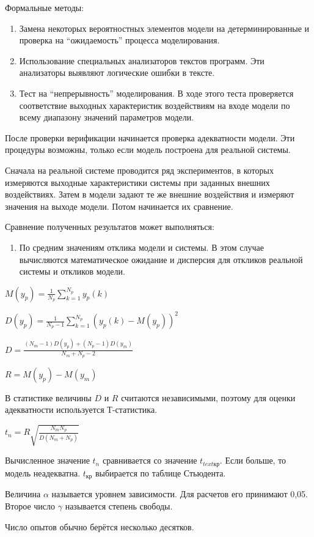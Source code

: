 \documentclass[12pt, russian, oneside, article]{ncc}
\begin{document}
Формальные методы:
\begin{enumerate}
\item Замена некоторых вероятностных элементов модели на детерминированные и проверка на ``ожидаемость'' процесса моделирования.
\item Использование специальных анализаторов текстов программ. Эти анализаторы выявляют логические ошибки в тексте.
\item Тест на ``непрерывность'' моделирования. В ходе этого теста проверяется соответствие выходных характеристик воздействиям на входе модели по всему диапазону значений параметров модели.
\end{enumerate}

После проверки верификации начинается проверка адекватности модели. Эти процедуры возможны, только если модель построена для реальной системы.

Сначала на реальной системе проводится ряд экспериментов, в которых измеряются выходные характеристики системы при заданных внешних воздействиях. Затем в модели задают те же внешние воздействия и измеряют значения на выходе модели. Потом начинается их сравнение.

Сравнение полученных результатов может выполняться:
\begin{enumerate}
\item По средним значениям отклика модели и системы. В этом случае вычисляются математическое ожидание и дисперсия для откликов реальной системы и откликов модели.
\end{enumerate}

$M(y_p) = \frac{1}{N_p}\sum_{k=1}^{N_p}y_p(k)$

$D(y_p) = \frac{1}{N_p-1}\sum_{k=1}^{N_p}(y_p(k)-M(y_p))^2$

$D = \frac{(N_m - 1)D(y_p) + (N_p - 1 ) D(y_m)}{N_m + N_p -2}$

$R = M(y_p) - M(y_m)$

В статистике величины $D$ и $R$ считаются независимыми, поэтому для оценки адекватности используется Т-статистика.

$t_n = R\sqrt{\frac{N_m N_p}{D(N_m + N_p)}}$

Вычисленное значение $t_n$ сравнивается со значение $t_{text{кр}}$. Если больше, то модель неадекватна. $t_\text{{кр}}$ выбирается по таблице Стьюдента.

Величина $\alpha$ называется уровнем зависимости. Для расчетов его принимают 0,05. Второе число $\gamma$ называется степень свободы.

Число опытов обычно берётся несколько десятков.
\end{document}

